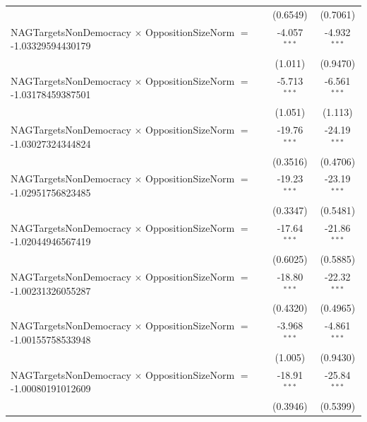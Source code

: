 \begin{tabular}{lcc}
                                                                                & (0.6549)             & (0.7061)\\   
   NAGTargetsNonDemocracy $\times$ OppositionSizeNorm $=$ -1.03329594430179     & -4.057$^{***}$       & -4.932$^{***}$\\   
                                                                                & (1.011)              & (0.9470)\\   
   NAGTargetsNonDemocracy $\times$ OppositionSizeNorm $=$ -1.03178459387501     & -5.713$^{***}$       & -6.561$^{***}$\\   
                                                                                & (1.051)              & (1.113)\\   
   NAGTargetsNonDemocracy $\times$ OppositionSizeNorm $=$ -1.03027324344824     & -19.76$^{***}$       & -24.19$^{***}$\\   
                                                                                & (0.3516)             & (0.4706)\\   
   NAGTargetsNonDemocracy $\times$ OppositionSizeNorm $=$ -1.02951756823485     & -19.23$^{***}$       & -23.19$^{***}$\\   
                                                                                & (0.3347)             & (0.5481)\\   
   NAGTargetsNonDemocracy $\times$ OppositionSizeNorm $=$ -1.02044946567419     & -17.64$^{***}$       & -21.86$^{***}$\\   
                                                                                & (0.6025)             & (0.5885)\\   
   NAGTargetsNonDemocracy $\times$ OppositionSizeNorm $=$ -1.00231326055287     & -18.80$^{***}$       & -22.32$^{***}$\\   
                                                                                & (0.4320)             & (0.4965)\\   
   NAGTargetsNonDemocracy $\times$ OppositionSizeNorm $=$ -1.00155758533948     & -3.968$^{***}$       & -4.861$^{***}$\\   
                                                                                & (1.005)              & (0.9430)\\   
   NAGTargetsNonDemocracy $\times$ OppositionSizeNorm $=$ -1.00080191012609     & -18.91$^{***}$       & -25.84$^{***}$\\   
                                                                                & (0.3946)             & (0.5399)\\   

\end{tabular}
